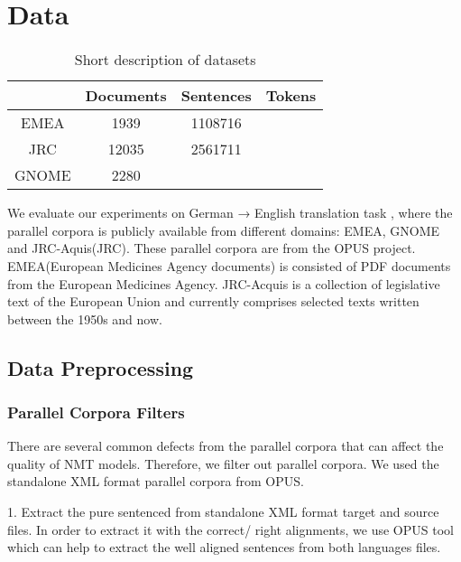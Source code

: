 \section{Data}\label{section:datasets}

\begin{table}[h] 
\centering
\begin{tabular}{cccc}
\hline
        & Documents  & Sentences & Tokens \\ \hline
EMEA    & 1939    &1108716    & \\ 
JRC    & 12035    & 2561711   & \\ 
GNOME    & 2280    &    & \\ \hline
\end{tabular}
\caption{Short description of datasets}
\label{Tab:Dataset}
\end{table}
We evaluate our experiments on German → English translation task , where the parallel corpora is publicly available from different domains: EMEA, GNOME and JRC-Aquis(JRC). These parallel corpora are from the OPUS project\parencite[]{tiedemann2012parallel}. EMEA(European Medicines Agency documents) is consisted of PDF documents from the European Medicines Agency. JRC-Acquis is a collection of legislative text of the European Union and currently comprises selected texts written between the 1950s and now.


\subsection{Data Preprocessing}

\subsubsection{Parallel Corpora Filters}

There are several common defects from the parallel corpora that can affect the quality of NMT models. Therefore, we filter out parallel corpora. We used the standalone XML format parallel corpora from OPUS.  

1. Extract the pure sentenced from standalone XML format target and source files. In order to extract it with the correct/ right alignments, we use OPUS tool which can help to extract the well aligned sentences from both languages files.

